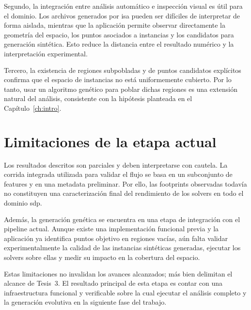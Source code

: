 Segundo, la integración entre análisis automático e inspección visual es útil para el
dominio.
Los archivos generados por \acrshort{isa} pueden ser difíciles de interpretar de forma
aislada, mientras que la aplicación permite observar directamente la geometría del
espacio, los puntos asociados a instancias y los candidatos para generación sintética.
Esto reduce la distancia entre el resultado numérico y la interpretación experimental.

Tercero, la existencia de regiones subpobladas y de puntos candidatos explícitos confirma que
el espacio de instancias no está uniformemente cubierto.
Por lo tanto, usar un algoritmo genético para poblar dichas regiones es una extensión
natural del análisis, consistente con la hipótesis planteada en el
Capítulo~\ref{ch:intro}.

\section{Limitaciones de la etapa actual}
\label{sec:resultados_limitaciones}

Los resultados descritos son parciales y deben interpretarse con cautela.
La corrida integrada utilizada para validar el flujo se basa en un subconjunto de
features y en una metadata preliminar.
Por ello, las footprints observadas todavía no constituyen una caracterización final
del rendimiento de los solvers en todo el dominio \acrshort{sdp}.

Además, la generación genética se encuentra en una etapa de integración con el
pipeline actual.
Aunque existe una implementación funcional previa y la aplicación ya identifica puntos
objetivo en regiones vacías, aún falta validar experimentalmente la calidad de las
instancias sintéticas generadas, ejecutar los solvers sobre ellas y medir su impacto
en la cobertura del espacio.

Estas limitaciones no invalidan los avances alcanzados; más bien delimitan el alcance
de Tesis~3.
El resultado principal de esta etapa es contar con una infraestructura funcional y
verificable sobre la cual ejecutar el análisis completo y la generación evolutiva en
la siguiente fase del trabajo.
